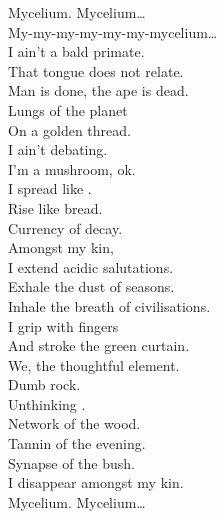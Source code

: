 
\label{album:ice-death-planets-mushrooms-lava}





Mycelium. Mycelium… \\
My-my-my-my-my-my-mycelium… \\

I ain't a bald primate. \\
That tongue does not relate. \\
Man is done, the ape is dead. \\
Lungs of the planet \\
On a golden thread. \\
I ain't debating. \\
I'm a mushroom, ok. \\
I spread like . \\
Rise like bread. \\
Currency of decay. \\

Amongst my kin, \\
I extend acidic salutations. \\
Exhale the dust of seasons. \\
Inhale the breath of civilisations. \\
I grip with  fingers \\
And stroke the green curtain. \\
We, the thoughtful element. \\

Dumb rock. \\
Unthinking . \\
Network of the wood. \\
Tannin of the evening. \\
Synapse of the bush. \\
I disappear amongst my kin. \\

Mycelium. Mycelium… \\


